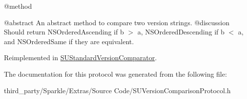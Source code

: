 @method

@abstract An abstract method to compare two version strings. @discussion Should return N\+S\+Ordered\+Ascending if b $>$ a, N\+S\+Ordered\+Descending if b $<$ a, and N\+S\+Ordered\+Same if they are equivalent. 

Reimplemented in \mbox{\hyperlink{interface_s_u_standard_version_comparator_a32eac2a727abd9d3c6890f7ac7ca50f1}{S\+U\+Standard\+Version\+Comparator}}.



The documentation for this protocol was generated from the following file\+:\begin{DoxyCompactItemize}
\item 
third\+\_\+party/\+Sparkle/\+Extras/\+Source Code/S\+U\+Version\+Comparison\+Protocol.\+h\end{DoxyCompactItemize}
